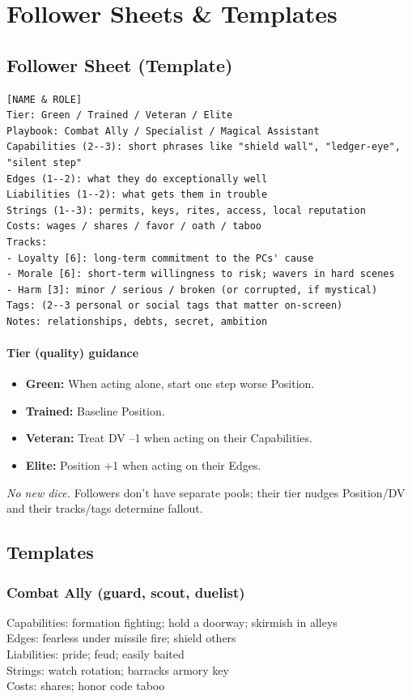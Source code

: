 \tableofcontents
\newpage

\section{Follower Sheets \& Templates}
\subsection{Follower Sheet (Template)}
\begin{verbatim}
[NAME & ROLE]
Tier: Green / Trained / Veteran / Elite
Playbook: Combat Ally / Specialist / Magical Assistant
Capabilities (2--3): short phrases like "shield wall", "ledger-eye", "silent step"
Edges (1--2): what they do exceptionally well
Liabilities (1--2): what gets them in trouble
Strings (1--3): permits, keys, rites, access, local reputation
Costs: wages / shares / favor / oath / taboo
Tracks:
- Loyalty [6]: long-term commitment to the PCs' cause
- Morale [6]: short-term willingness to risk; wavers in hard scenes
- Harm [3]: minor / serious / broken (or corrupted, if mystical)
Tags: (2--3 personal or social tags that matter on-screen)
Notes: relationships, debts, secret, ambition
\end{verbatim}

\paragraph{Tier (quality) guidance}
\begin{itemize}
  \item \textbf{Green:} When acting alone, start one step worse Position.
  \item \textbf{Trained:} Baseline Position.
  \item \textbf{Veteran:} Treat DV --1 when acting on their Capabilities.
  \item \textbf{Elite:} Position +1 when acting on their Edges.
\end{itemize}
\emph{No new dice.} Followers don't have separate pools; their tier nudges Position/DV and their tracks/tags determine fallout.

\subsection{Templates}
\subsubsection*{Combat Ally (guard, scout, duelist)}
Capabilities: formation fighting; hold a doorway; skirmish in alleys\\
Edges: fearless under missile fire; shield others\\
Liabilities: pride; feud; easily baited\\
Strings: watch rotation; barracks armory key\\
Costs: shares; honor code taboo

